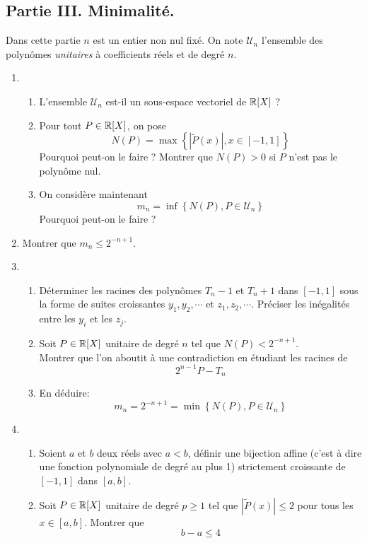 \subsection*{Partie III. Minimalité.}
Dans cette partie $n$ est un entier non nul fixé. On note $\mathcal U_n$ l'ensemble des polynômes \emph{unitaires} à coefficients réels et de degré $n$.
\begin{enumerate}
 \item 
\begin{enumerate}
 \item L'ensemble $\mathcal U_n$ est-il un sous-espace vectoriel de $\mathbb{R}[X]$ ?
\item Pour tout $P\in \mathbb{R}[X]$, on pose 
\begin{displaymath}
N(P)=\max\left\lbrace \left\vert\widetilde{P}(x)\right\vert, x\in[-1,1]\right\rbrace  
\end{displaymath}
Pourquoi peut-on le faire ? Montrer que $N(P)>0$ si $P$ n'est pas le polynôme nul.
\item On considère maintenant
\begin{displaymath}
 m_n = \inf\left\lbrace N(P), P\in \mathcal U_n \right\rbrace 
\end{displaymath}
Pourquoi peut-on le faire ?
\end{enumerate}
\item Montrer que $m_n\leq 2^{-n+1}$.
\item \begin{enumerate}
 \item Déterminer les racines des polynômes $T_n - 1$ et $T_n + 1$ dans $[-1,1]$ sous la forme de suites croissantes $y_1,y_2,\cdots$ et $z_1,z_2,\cdots$. Préciser les inégalités entre les $y_i$ et les $z_j$.
\item Soit $P\in \mathbb{R}[X]$ unitaire de degré $n$ tel que $N(P)<2^{-n+1}$.\\
Montrer que l'on aboutit à une contradiction en étudiant les racines de
\begin{displaymath}
 2^{n-1}P - T_n
\end{displaymath}

\item En déduire:
\begin{displaymath}
 m_n = 2^{-n+1} = \min\left\lbrace N(P), P\in \mathcal U_n \right\rbrace
\end{displaymath}
\end{enumerate}
\item \begin{enumerate}
 \item Soient $a$ et $b$ deux réels avec $a<b$, définir une bijection affine (c'est à dire une fonction polynomiale de degré au plus 1) strictement croissante de $[-1,1]$ dans $[a,b]$.
\item Soit $P\in\mathbb{R}[X]$ unitaire de degré $p\geq 1$ tel que $|\widetilde{P}(x)|\leq 2$ pour tous les $x\in[a,b]$. Montrer que
\begin{displaymath}
 b-a \leq 4
\end{displaymath}

\end{enumerate}

\end{enumerate}
